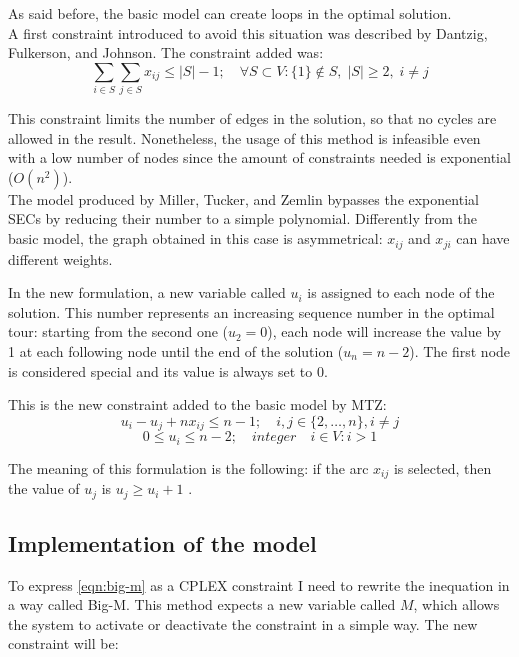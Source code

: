 As said before, the basic model can create loops in the optimal solution.\\
A first constraint introduced to avoid this situation was described by Dantzig, Fulkerson, and Johnson. The constraint added was:
\begin{equation}
\sum_{i\in S}\sum_{j \in S}x_{ij}\le |S|-1; \quad \forall S \subset V:\{1\}\not \in S, \; |S|\ge 2, \; i\not = j
\end{equation}


This constraint limits the number of edges in the solution, so that no cycles are allowed in the result. Nonetheless, the usage of this method is infeasible even with a low number of nodes since the amount of constraints needed is exponential ($O(n^2)$).\\

The model produced by Miller, Tucker, and Zemlin bypasses the exponential SECs by reducing their number to a simple polynomial.  Differently from the basic model, the graph obtained in this case is asymmetrical: $x_{ij}$ and $x_{ji}$ can have different weights.

In the new formulation, a new variable called $u_i$ is assigned to each node of the solution. This number represents an increasing sequence number in the optimal tour: starting from the second one ($u_2=0$), each node will increase the value by 1 at each following node until the end of the solution ($u_n=n-2$). The first node is considered special and its value is always set to $0$.

This is the new constraint added to the basic model by MTZ:
	\begin{equation}
	\label{eqn:big-m}
	u_i-u_j+nx_{ij}\le n-1; \quad i,j\in \{2, \dots, n\}, i \not=j
	\end{equation}
	\begin{equation}
	\label{eqn:u-bound}
	0 \le u_i \le n-2; \quad integer \quad i \in V:i>1
	\end{equation}


The meaning of this formulation is the following: if the arc $x_{ij}$ is selected, then the value of $u_j$ is $u_j \ge u_i+1$ .

\subsection{Implementation of the model}
To express \ref{eqn:big-m} as a CPLEX constraint I need to rewrite the inequation in a way called Big-M. This method expects a new variable called $M$, which allows the system to activate or deactivate the constraint in a simple way. The new constraint will be:


